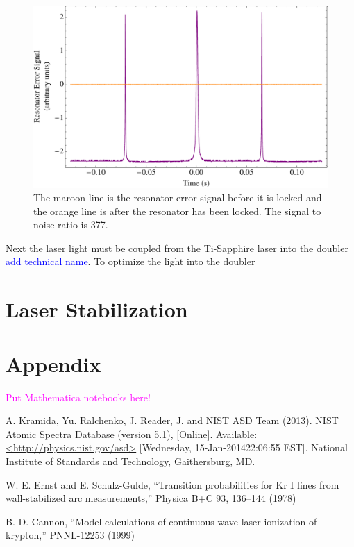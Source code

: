 \documentclass[prb,preprint]{revtex4-1}
\begin{document}
\begin{figure}[h!]
\centering
\includegraphics[width=6in]{ResonatorError.pdf}
\caption{The maroon line is the resonator error signal before it is locked and the orange line is after the resonator has been locked. The signal to noise ratio is 377.}
\label{ResonatorError}
\end{figure}

Next the laser light must be coupled from the Ti-Sapphire laser into the doubler \textcolor{blue}{add technical name}. To optimize the light into the doubler 


\section{Laser Stabilization}

\section{Appendix}

\textcolor{magenta}{Put Mathematica notebooks here!}


\begin{thebibliography}{2}

 A. Kramida, Yu. Ralchenko, J. Reader, J. and NIST ASD Team (2013). NIST Atomic Spectra Database (version 5.1), [Online]. Available: \url{<http://physics.nist.gov/asd>} [Wednesday, 15-Jan-201422:06:55 EST]. National Institute of Standards and Technology, Gaithersburg, MD.

 W. E. Ernst and E. Schulz-Gulde, ``Transition probabilities for Kr I lines from wall-stabilized arc measurements,'' Physica B+C 93, 136–144 (1978)

 B. D. Cannon, ``Model calculations of continuous-wave laser ionization of krypton,'' PNNL-12253 (1999)

\end{thebibliography}
\end{document}
